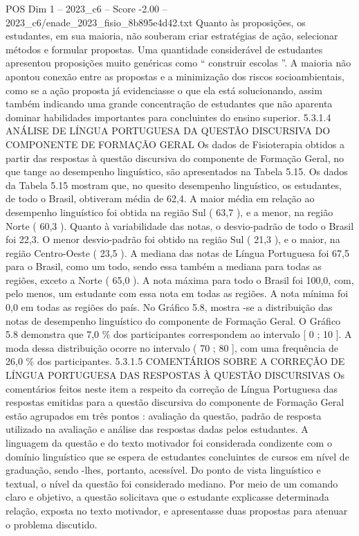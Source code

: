 \begin{textsample}{POS Dim 1 – 2023\_c6 – Score -2.00 – 2023\_c6/enade\_2023\_fisio\_8b895e4d42.txt}
Quanto às proposições, os estudantes, em sua maioria, não souberam criar estratégias de ação, selecionar métodos e formular propostas.
Uma quantidade considerável de estudantes apresentou proposições muito genéricas como “ construir escolas ”.
A maioria não apontou conexão entre as propostas e a minimização dos riscos socioambientais, como se a ação proposta já evidenciasse o que ela está solucionando, assim também indicando uma grande concentração de estudantes que não aparenta dominar habilidades importantes para concluintes do ensino superior. 5.3.1.4 ANÁLISE DE LÍNGUA PORTUGUESA DA QUESTÃO DISCURSIVA DO COMPONENTE DE FORMAÇÃO GERAL Os dados de Fisioterapia obtidos a partir das respostas à questão discursiva do componente de Formação Geral, no que tange ao desempenho linguístico, são apresentados na Tabela 5.15.
Os dados da Tabela 5.15 mostram que, no quesito desempenho linguístico, os estudantes, de todo o Brasil, obtiveram média de 62,4.
A maior média em relação ao desempenho linguístico foi obtida na região Sul ( 63,7 ), e a menor, na região Norte ( 60,3 ).
Quanto à variabilidade das notas, o desvio-padrão de todo o Brasil foi 22,3.
O menor desvio-padrão foi obtido na região Sul ( 21,3 ), e o maior, na região Centro-Oeste ( 23,5 ).
A mediana das notas de Língua Portuguesa foi 67,5 para o Brasil, como um todo, sendo essa também a mediana para todas as regiões, exceto a Norte ( 65,0 ).
A nota máxima para todo o Brasil foi 100,0, com, pelo menos, um estudante com essa nota em todas as regiões.
A nota mínima foi 0,0 em todas as regiões do país.
No Gráfico 5.8, mostra -se a distribuição das notas de desempenho linguístico do componente de Formação Geral.
O Gráfico 5.8 demonstra que 7,0 \% dos participantes correspondem ao intervalo [ 0 ; 10 ].
A moda dessa distribuição ocorre no intervalo ( 70 ; 80 ], com uma frequência de 26,0 \% dos participantes. 5.3.1.5 COMENTÁRIOS SOBRE A CORREÇÃO DE LÍNGUA PORTUGUESA DAS RESPOSTAS À QUESTÃO DISCURSIVAS Os comentários feitos neste item a respeito da correção de Língua Portuguesa das respostas emitidas para a questão discursiva do componente de Formação Geral estão agrupados em três pontos : avaliação da questão, padrão de resposta utilizado na avaliação e análise das respostas dadas pelos estudantes.
A linguagem da questão e do texto motivador foi considerada condizente com o domínio linguístico que se espera de estudantes concluintes de cursos em nível de graduação, sendo -lhes, portanto, acessível.
Do ponto de vista linguístico e textual, o nível da questão foi considerado mediano.
Por meio de um comando claro e objetivo, a questão solicitava que o estudante explicasse determinada relação, exposta no texto motivador, e apresentasse duas propostas para atenuar o problema discutido.

\end{textsample}
